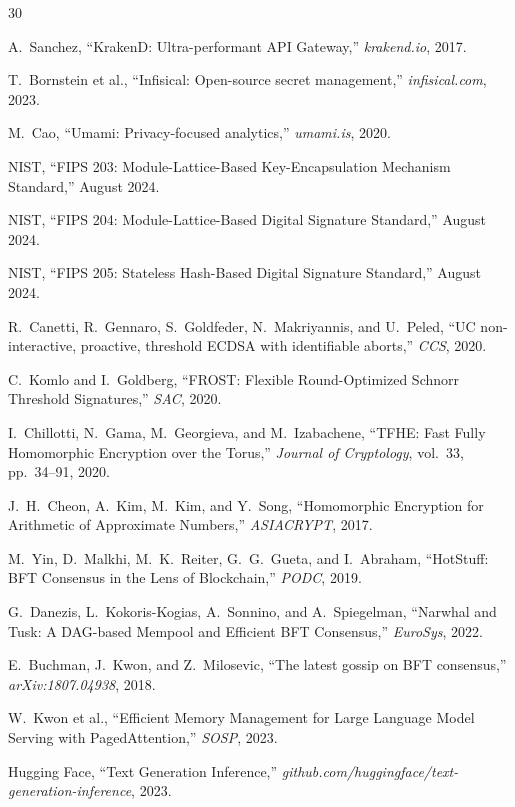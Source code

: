 \begin{thebibliography}{30}

A.~Sanchez, ``KrakenD: Ultra-performant API Gateway,'' \textit{krakend.io}, 2017.

T.~Bornstein et al., ``Infisical: Open-source secret management,'' \textit{infisical.com}, 2023.

M.~Cao, ``Umami: Privacy-focused analytics,'' \textit{umami.is}, 2020.

NIST, ``FIPS 203: Module-Lattice-Based Key-Encapsulation Mechanism Standard,'' August 2024.

NIST, ``FIPS 204: Module-Lattice-Based Digital Signature Standard,'' August 2024.

NIST, ``FIPS 205: Stateless Hash-Based Digital Signature Standard,'' August 2024.

R.~Canetti, R.~Gennaro, S.~Goldfeder, N.~Makriyannis, and U.~Peled, ``UC non-interactive, proactive, threshold ECDSA with identifiable aborts,'' \textit{CCS}, 2020.

C.~Komlo and I.~Goldberg, ``FROST: Flexible Round-Optimized Schnorr Threshold Signatures,'' \textit{SAC}, 2020.

I.~Chillotti, N.~Gama, M.~Georgieva, and M.~Izabachene, ``TFHE: Fast Fully Homomorphic Encryption over the Torus,'' \textit{Journal of Cryptology}, vol.~33, pp.~34--91, 2020.

J.~H.~Cheon, A.~Kim, M.~Kim, and Y.~Song, ``Homomorphic Encryption for Arithmetic of Approximate Numbers,'' \textit{ASIACRYPT}, 2017.

M.~Yin, D.~Malkhi, M.~K.~Reiter, G.~G.~Gueta, and I.~Abraham, ``HotStuff: BFT Consensus in the Lens of Blockchain,'' \textit{PODC}, 2019.

G.~Danezis, L.~Kokoris-Kogias, A.~Sonnino, and A.~Spiegelman, ``Narwhal and Tusk: A DAG-based Mempool and Efficient BFT Consensus,'' \textit{EuroSys}, 2022.

E.~Buchman, J.~Kwon, and Z.~Milosevic, ``The latest gossip on BFT consensus,'' \textit{arXiv:1807.04938}, 2018.

W.~Kwon et al., ``Efficient Memory Management for Large Language Model Serving with PagedAttention,'' \textit{SOSP}, 2023.

Hugging Face, ``Text Generation Inference,'' \textit{github.com/huggingface/text-generation-inference}, 2023.


\end{thebibliography}
